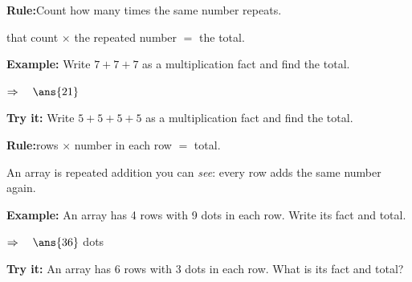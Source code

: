 \documentclass[12pt]{article}
\begin{document}


\begin{formulabox}
\textbf{Rule:}\quad Count how many times the same number repeats.\par
that count $\times$ the repeated number $=$ the total.
\end{formulabox}

\begin{examplebox}
\textbf{Example:} Write $7 + 7 + 7$ as a multiplication fact and find the total.

$\Rightarrow\quad\ans{21}$
\end{examplebox}

\begin{tryitbox}
\textbf{Try it:} Write $5 + 5 + 5 + 5$ as a multiplication fact and find the total.\\[2pt]
\end{tryitbox}


\begin{formulabox}
\textbf{Rule:}\quad rows $\times$ number in each row $=$ total.\par
An array is repeated addition you can \emph{see}: every row adds the same number again.
\end{formulabox}

\begin{examplebox}
\textbf{Example:} An array has 4 rows with 9 dots in each row. Write its fact and total.

$\Rightarrow\quad\ans{36}$ dots
\end{examplebox}

\begin{tryitbox}
\textbf{Try it:} An array has 6 rows with 3 dots in each row. What is its fact and total?\\[2pt]
\end{tryitbox}

\end{document}
